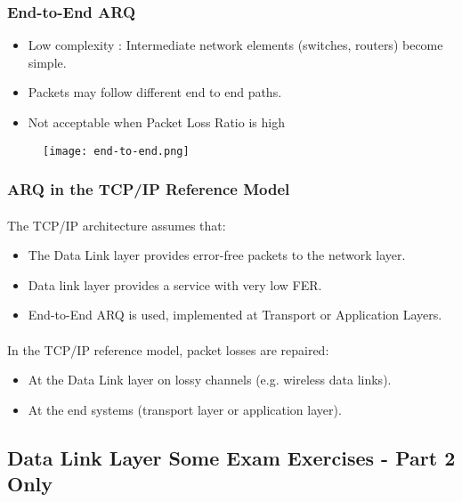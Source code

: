 \documentclass[../resumosRCOM.tex]{subfiles}
\begin{document}
\subsubsection{End-to-End ARQ}
\begin{itemize}
    \item Low complexity : Intermediate network elements (switches, routers) become 
    simple.
    \item Packets may follow different end to end paths.
    \item Not acceptable when Packet Loss Ratio is high
\end{itemize}
\begin{figure}[H]
    \centering
    \texttt{[image: end-to-end.png]}
\end{figure}

\subsubsection{ARQ in the TCP/IP Reference Model}
\paragraph{}
The TCP/IP architecture assumes that:
\begin{itemize}
    \item The Data Link layer provides error-free packets to the network layer.
    \item Data link layer provides a service with very low FER.
    \item End-to-End ARQ is used, implemented at Transport or Application Layers.
\end{itemize}

\paragraph{}
In the TCP/IP reference model, packet losses are repaired:
\begin{itemize}
    \item At the Data Link layer on lossy channels (e.g. wireless data links).
    \item At the end systems (transport layer or application layer).
\end{itemize}


\subsection{Data Link Layer Some Exam Exercises - Part 2 Only}
\end{document}
